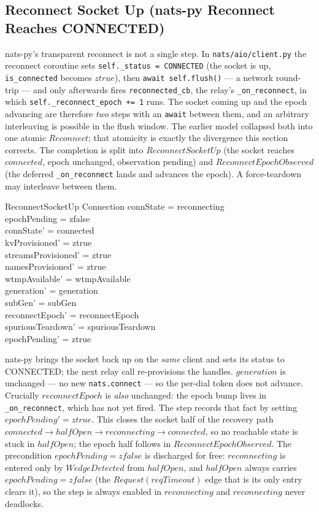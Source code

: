 \documentclass[a4paper,10pt,fleqn]{article}
\begin{document}
\subsection{Reconnect Socket Up (nats-py Reconnect Reaches CONNECTED)}
\label{sec:flushwindow}

nats-py's transparent reconnect is not a single step.  In
\texttt{nats/aio/client.py} the reconnect coroutine sets
\texttt{self.\_status = CONNECTED} (the socket is up,
\texttt{is\_connected} becomes $ztrue$), then \texttt{await
self.flush()} --- a network round-trip --- and only afterwards fires
\texttt{reconnected\_cb}, the relay's \texttt{\_on\_reconnect}, in which
\texttt{self.\_reconnect\_epoch += 1} runs.  The socket coming up and the
epoch advancing are therefore \emph{two} steps with an \texttt{await}
between them, and an arbitrary interleaving is possible in the flush
window.  The earlier model collapsed both into one atomic $Reconnect$;
that atomicity is exactly the divergence this section corrects.  The
completion is split into $ReconnectSocketUp$ (the socket reaches
$connected$, epoch unchanged, observation pending) and
$ReconnectEpochObserved$ (the deferred \texttt{\_on\_reconnect} lands and
advances the epoch).  A force-teardown may interleave between them.

\begin{schema}{ReconnectSocketUp}
  \Delta Connection
  \where
  connState = reconnecting \\
  epochPending = zfalse \\
  connState' = connected \\
  kvProvisioned' = ztrue \\
  streamsProvisioned' = ztrue \\
  namesProvisioned' = ztrue \\
  wtmpAvailable' = wtmpAvailable \\
  generation' = generation \\
  subGen' = subGen \\
  reconnectEpoch' = reconnectEpoch \\
  spuriousTeardown' = spuriousTeardown \\
  epochPending' = ztrue
\end{schema}

nats-py brings the socket back up on the \emph{same} client and sets its
status to CONNECTED; the next relay call re-provisions the handles.
$generation$ is unchanged --- no new \texttt{nats.connect} --- so the
per-dial token does not advance.  Crucially $reconnectEpoch$ is
\emph{also} unchanged: the epoch bump lives in
\texttt{\_on\_reconnect}, which has not yet fired.  The step records that
fact by setting $epochPending' = ztrue$.  This closes the socket half of
the recovery path $connected \to halfOpen \to reconnecting \to
connected$, so no reachable state is stuck in $halfOpen$; the epoch half
follows in $ReconnectEpochObserved$.  The precondition $epochPending =
zfalse$ is discharged for free: $reconnecting$ is entered only by
$WedgeDetected$ from $halfOpen$, and $halfOpen$ always carries
$epochPending = zfalse$ (the $Request(reqTimeout)$ edge that is its only
entry clears it), so the step is always enabled in $reconnecting$ and
$reconnecting$ never deadlocks.
\end{document}
